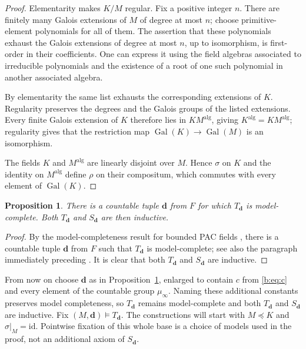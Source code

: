 \documentclass[11pt,a4paper]{amsart}
\newtheorem{proposition}[theorem]{Proposition}
\theoremstyle{definition}
\newcommand{\alg}{\mathrm{alg}}
\newcommand{\bd}{\boldsymbol d}
\DeclareMathOperator{\Gal}{Gal}
\begin{document}
\begin{proof}
Elementarity makes $K/M$ regular. Fix a positive integer $n$. There
are finitely many Galois extensions of $M$ of degree at most $n$;
choose primitive-element polynomials for all of them. The assertion
that these polynomials exhaust the Galois extensions of degree at
most $n$, up to isomorphism, is first-order in their coefficients.
One can express it using the field algebras associated to irreducible
polynomials and the existence of a root of one such polynomial in
another associated algebra.

By elementarity the same list exhausts the corresponding extensions
of $K$. Regularity preserves the degrees and the Galois groups of
the listed extensions. Every finite Galois extension of $K$ therefore
lies in $KM^{\alg}$, giving $K^{\alg}=KM^{\alg}$; regularity gives that the restriction map $\Gal(K)\to \Gal(M)$ is an isomorphism.

The fields $K$ and $M^{\alg}$ are linearly disjoint over $M$. Hence
$\sigma$ on $K$ and the identity on $M^{\alg}$ define $\rho$ on their
compositum, which commutes with every element of $\Gal(K)$.
\end{proof}

\begin{proposition}\label{b:prop:constants}
There is a countable tuple $\bd$ from $F$ for which $T_{\bd}$ is
model-complete. Both $T_{\bd}$ and $S_{\bd}$ are then inductive.
\end{proposition}

\begin{proof}

By the model-completeness result for bounded PAC fields
\cite[Section~4.6]{CP}, there is a countable tuple $\bd$ from $F$
such that $T_{\bd}$ is model-complete; see also the paragraph
immediately preceding \cite[Theorem~4.10]{HK}.
It is clear that both $T_{\bd}$ and $S_{\bd}$ are inductive.
\end{proof}

From now on choose $\bd$ as in
Proposition~\ref{b:prop:constants}, enlarged to contain $c$ from
\eqref{b:eq:c} and every element of the countable group
$\mu_\infty$. Naming these additional constants preserves
model completeness, so $T_{\bd}$ remains model-complete and
both $T_{\bd}$ and $S_{\bd}$ are inductive.
Fix $(M,\bd)\models T_{\bd}$.
The constructions will start with $M\preccurlyeq K$ and
$\sigma|_M=\mathrm{id}$. Pointwise fixation of this whole base is a
choice of models used in the proof, not an additional axiom of $S_{\bd}$.
\end{document}
